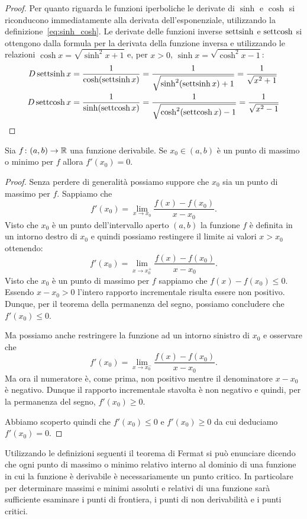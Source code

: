 \begin{proof}
Per quanto riguarda le funzioni iperboliche le derivate di $\sinh$
e $\cosh$ si riconducono immediatamente alla derivata dell'esponenziale,
utilizzando
la definizione~\eqref{eq:sinh_cosh}. Le derivate delle funzioni
inverse $\operatorname{settsinh}$ e $\operatorname{settcosh}$ si ottengono dalla formula per la derivata
della funzione inversa e utilizzando
le relazioni $\cosh x = \sqrt{\sinh^2 x+1}$ e, per $x > 0$,
$\sinh x = \sqrt{\cosh^2 x -1}$:
\begin{align*}
  D \operatorname{settsinh} x &= \frac{1}{\cosh(\operatorname{settsinh} x)}
  = \frac{1}{\sqrt{\sinh^2 (\operatorname{settsinh} x) + 1}} = \frac{1}{\sqrt{x^2+1}}\\
  D \operatorname{settcosh} x &= \frac{1}{\sinh(\operatorname{settcosh} x)}
  = \frac{1}{\sqrt{\cosh^2(\operatorname{settcosh} x)-1}}
  = \frac{1}{\sqrt{x^2-1}}
\end{align*}
\end{proof}

\begin{theorem}[Fermat]
\mymark{***}
Sia $f\colon (a,b)\to \mathbb R$ una funzione derivabile.
Se $x_0\in (a,b)$ è un punto di massimo o minimo per $f$ allora
$f'(x_0)=0$.
\end{theorem}
%
\begin{proof}
\mymark{***}
Senza perdere di generalità possiamo suppore che $x_0$ sia un punto di massimo per $f$.
Sappiamo che
\[
  f'(x_0) = \lim_{x\to x_0}\frac{f(x)-f(x_0)}{x-x_0}.
\]
Visto che $x_0$ è un punto dell'intervallo aperto $(a,b)$ la funzione $f$ è definita in un intorno destro di $x_0$ e quindi possiamo restingere il limite ai valori $x>x_0$ ottenendo:
\[
  f'(x_0) = \lim_{x\to x_0^+}\frac{f(x) - f(x_0)}{x-x_0}.
\]
Visto che $x_0$ è un punto di massimo per $f$ sappiamo che $f(x)-f(x_0)\le 0$. Essendo $x-x_0>0$ l'intero rapporto incrementale risulta essere non positivo.
Dunque, per il teorema della permanenza del segno,
possiamo concludere che $f'(x_0)\le 0$.

Ma possiamo anche restringere la funzione ad un intorno sinistro di $x_0$ e osservare che
\[
  f'(x_0) = \lim_{x\to x_0^-}\frac{f(x)-f(x_0)}{x-x_0}.
\]
Ma ora il numeratore è, come prima, non positivo mentre il denominatore $x-x_0$ è negativo. Dunque il rapporto incrementale stavolta è non negativo e quindi, per la permanenza del segno, $f'(x_0) \ge 0$.

Abbiamo scoperto quindi che $f'(x_0)\le 0$ e $f'(x_0)\ge 0$
da cui deduciamo $f'(x_0)=0$.
\end{proof}

Utilizzando le definizioni seguenti il teorema di Fermat si può
enunciare dicendo che ogni punto di massimo o minimo relativo interno
al dominio di una funzione in cui la funzione è derivabile
è necessariamente un punto critico.
In particolare per determinare massimi e minimi assoluti e relativi
di una funzione sarà sufficiente esaminare i punti di frontiera,
i punti di non derivabilità e i punti critici.

